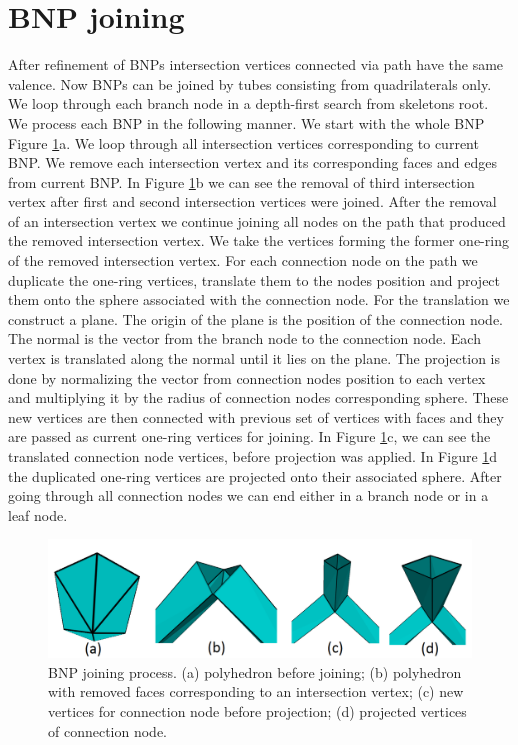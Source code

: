 \section{BNP joining}\label{sec:bnp_join}
After refinement of BNPs intersection vertices connected via path have the same valence. Now BNPs can be joined by tubes consisting from quadrilaterals only. We loop through each branch node in a depth-first search from skeletons root. We process each BNP in the following manner. We start with the whole BNP Figure \ref{fig:joining_process_ilu}a. We loop through all intersection vertices corresponding to current BNP. We remove each intersection vertex and its corresponding faces and edges from current BNP. In Figure \ref{fig:joining_process_ilu}b we can see the removal of third intersection vertex after first and second intersection vertices were joined. After the removal of an intersection vertex we continue joining all nodes on the path that produced the removed intersection vertex. We take the vertices forming the former one-ring of the removed intersection vertex. For each connection node on the path we duplicate the one-ring vertices, translate them to the nodes position and project them onto the sphere associated with the connection node. For the translation we construct a plane. The origin of the plane is the position of the connection node. The normal is the vector from the branch node to the connection node. Each vertex is translated along the normal until it lies on the plane. The projection is done by normalizing the vector from connection nodes position to each vertex and multiplying it by the radius of connection nodes corresponding sphere. These new vertices are then connected with previous set of vertices with faces and they are passed as current one-ring vertices for joining. In Figure \ref{fig:joining_process_ilu}c, we can see the translated connection node vertices, before projection was applied. In Figure \ref{fig:joining_process_ilu}d the duplicated one-ring vertices are projected onto their associated sphere. After going through all connection nodes we can end either in a branch node or in a leaf node.

\begin{figure}[h]
    \centering
    \includegraphics[width=\textwidth]{images/joining_ilu.png}
    \caption[BNP joining process]{BNP joining process. (a) polyhedron before joining; (b) polyhedron with removed faces corresponding to an intersection vertex; (c) new vertices for connection node before projection; (d) projected vertices of connection node.}
    \label{fig:joining_process_ilu}
\end{figure}

